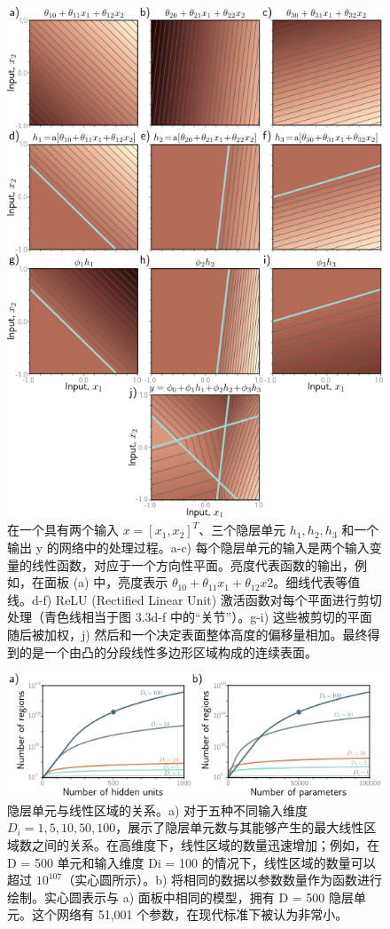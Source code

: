 \begin{figure}[ht!]
	\centering
	\includegraphics[width=0.7\linewidth]{png/chapter3/ShallowBuildUp2D.png}
\caption{在一个具有两个输入 \(x = [x_1,x_2]^T\)、三个隐层单元 \(h_1,h_2,h_3\) 和一个输出 y 的网络中的处理过程。a-c) 每个隐层单元的输入是两个输入变量的线性函数，对应于一个方向性平面。亮度代表函数的输出，例如，在面板 (a) 中，亮度表示 \(\theta_10 + \theta_{11}x_1 + \theta_{12} x2\)。细线代表等值线。d-f) ReLU (Rectified Linear Unit) 激活函数对每个平面进行剪切处理（青色线相当于图 3.3d-f 中的“关节”）。g-i) 这些被剪切的平面随后被加权，j) 然后和一个决定表面整体高度的偏移量相加。最终得到的是一个由凸的分段线性多边形区域构成的连续表面。}
\end{figure}

\begin{figure}[ht!]
	\centering
	\includegraphics[width=0.7\linewidth]{png/chapter3/ShallowRegions.png}
\caption{隐层单元与线性区域的关系。a) 对于五种不同输入维度 \(D_i = {1, 5, 10, 50, 100}\)，展示了隐层单元数与其能够产生的最大线性区域数之间的关系。在高维度下，线性区域的数量迅速增加；例如，在 D = 500 单元和输入维度 Di = 100 的情况下，线性区域的数量可以超过 $10^107$（实心圆所示）。b) 将相同的数据以参数数量作为函数进行绘制。实心圆表示与 a) 面板中相同的模型，拥有 D = 500 隐层单元。这个网络有 51,001 个参数，在现代标准下被认为非常小。}
\end{figure}


